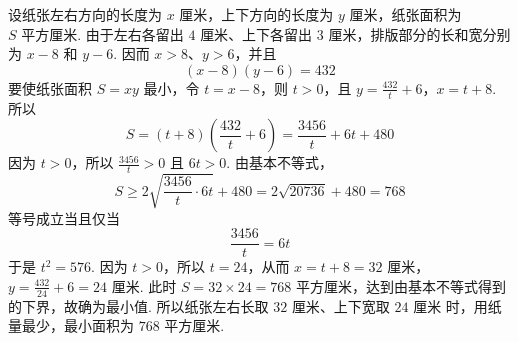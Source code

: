 \begin{solution}
设纸张左右方向的长度为 \(x\text{ 厘米}\)，上下方向的长度为 \(y\text{ 厘米}\)，纸张面积为 \(S\text{ 平方厘米}\). 由于左右各留出 \(4\text{ 厘米}\)、上下各留出 \(3\text{ 厘米}\)，排版部分的长和宽分别为 \(x-8\) 和 \(y-6\). 因而 \(x>8\)、\(y>6\)，并且
\[
(x-8)(y-6)=432
\]
要使纸张面积 \(S=xy\) 最小，令 \(t=x-8\)，则 \(t>0\)，且
\(y=\frac{432}{t}+6\)，\(x=t+8\).
所以
\[
S=(t+8)\left(\frac{432}{t}+6\right)=\frac{3456}{t}+6t+480
\]
因为 \(t>0\)，所以 \(\frac{3456}{t}>0\) 且 \(6t>0\). 由基本不等式，
\[
S\ge2\sqrt{\frac{3456}{t}\cdot6t}+480=2\sqrt{20736}+480=768
\]
等号成立当且仅当
\[
\frac{3456}{t}=6t
\]
于是 \(t^2=576\). 因为 \(t>0\)，所以 \(t=24\)，从而
\(x=t+8=32\text{ 厘米}\)，\(y=\frac{432}{24}+6=24\text{ 厘米}\).
此时 \(S=32\times24=768\text{ 平方厘米}\)，达到由基本不等式得到的下界，故确为最小值. 所以纸张左右长取 \(32\text{ 厘米}\)、上下宽取 \(24\text{ 厘米}\) 时，用纸量最少，最小面积为 \(768\text{ 平方厘米}\).
\end{solution}
